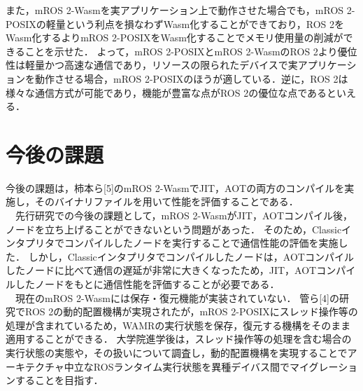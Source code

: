 また，mROS 2-Wasmを実アプリケーション上で動作させた場合でも，mROS 2-POSIXの軽量という利点を損なわずWasm化することができており，ROS 2をWasm化するよりmROS 2-POSIXをWasm化することでメモリ使用量の削減ができることを示せた．
よって，mROS 2-POSIXとmROS 2-WasmのROS 2より優位性は軽量かつ高速な通信であり，リソースの限られたデバイスで実アプリケーションを動作させる場合，mROS 2-POSIXのほうが適している．逆に，ROS 2は様々な通信方式が可能であり，機能が豊富な点がROS 2の優位な点であるといえる．
\section{今後の課題}
今後の課題は，柿本ら[5]のmROS 2-WasmでJIT，AOTの両方のコンパイルを実施し，そのバイナリファイルを用いて性能を評価することである．
\\　先行研究での今後の課題として，mROS 2-WasmがJIT，AOTコンパイル後，ノードを立ち上げることができないという問題があった．
そのため，Classicインタプリタでコンパイルしたノードを実行することで通信性能の評価を実施した．
しかし，Classicインタプリタでコンパイルしたノードは，AOTコンパイルしたノードに比べて通信の遅延が非常に大きくなったため，JIT，AOTコンパイルしたノードをもとに通信性能を評価することが必要である．
\\　現在のmROS 2-Wasmには保存・復元機能が実装されていない．
管ら[4]の研究でROS 2の動的配置機構が実現されたが，mROS 2-POSIXにスレッド操作等の処理が含まれているため，WAMRの実行状態を保存，復元する機構をそのまま適用することができる．
大学院進学後は，スレッド操作等の処理を含む場合の実行状態の実態や，その扱いについて調査し，動的配置機構を実現することでアーキテクチャ中立なROSランタイム実行状態を異種デイバス間でマイグレーションすることを目指す．
